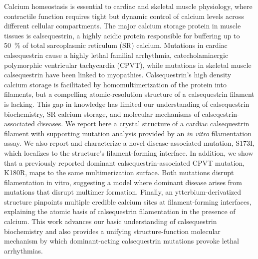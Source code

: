 Calcium homeostasis is essential to cardiac and skeletal muscle physiology, where contractile function requires tight but dynamic control of calcium levels across different cellular compartments. The major calcium storage protein in muscle tissues is calsequestrin, a highly acidic protein responsible for buffering up to \SI{50}{\percent} of total sarcoplasmic reticulum (SR) calcium. Mutations in cardiac calsequestrin cause a highly lethal familial arrhythmia, catecholaminergic polymorphic ventricular tachycardia (CPVT), while mutations in skeletal muscle calsequestrin have been linked to myopathies. Calsequestrin's high density calcium storage is facilitated by homomultimerization of the protein into filaments, but a compelling atomic-resolution structure of a calsequestrin filament is lacking. This gap in knowledge has limited our understanding of calsequestrin biochemistry, SR calcium storage, and molecular mechanisms of calseqestrin-associated diseases. We report here a crystal structure of a cardiac calsequestrin filament with supporting mutation analysis provided by an \textit{in vitro} filamentation assay. We also report and characterize a novel disease-associated mutation, S173I, which localizes to the structure's filament-forming interface. In addition, we show that a previously reported dominant calsequestrin-associated CPVT mutation, K180R, maps to the same multimerization surface. Both mutations disrupt filamentation in vitro, suggesting a model where dominant disease arises from mutations that disrupt multimer formation. Finally, an ytterbium-derivatized structure pinpoints multiple credible calcium sites at filament-forming interfaces, explaining the atomic basis of calsequestrin filamentation in the presence of calcium. This work advances our basic understanding of calsequestrin biochemistry and also provides a unifying structure-function molecular mechanism by which dominant-acting calsequestrin mutations provoke lethal arrhythmias.